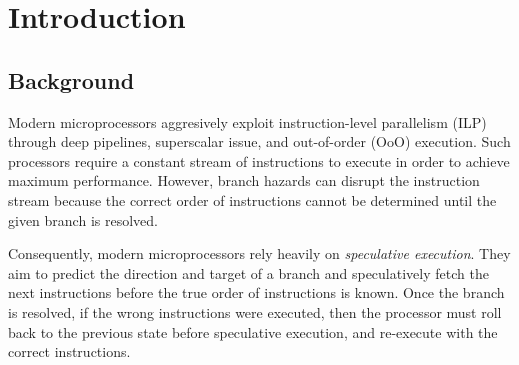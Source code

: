 \documentclass[conference]{IEEEtran}
\begin{document}




\maketitle


\begin{abstract}

\end{abstract}





%
\IEEEpeerreviewmaketitle



\section{Introduction}
\subsection{Background}
Modern microprocessors aggresively exploit instruction-level parallelism (ILP) through deep pipelines, superscalar issue, and out-of-order (OoO) execution. Such processors require a constant stream of instructions to execute in order to achieve maximum performance. However, branch hazards can disrupt the instruction stream because the correct order of instructions cannot be determined until the given branch is resolved.

Consequently, modern microprocessors rely heavily on \emph{speculative execution}. They aim to predict the direction and target of a branch and speculatively fetch the next instructions before the true order of instructions is known. Once the branch is resolved, if the wrong instructions were executed, then the processor must roll back to the previous state before speculative execution, and re-execute with the correct instructions. 
\end{document}
